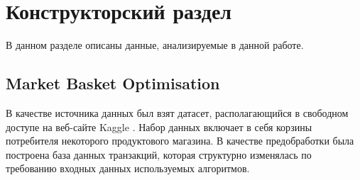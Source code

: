 \section{Конструкторский раздел}

В данном разделе описаны данные, анализируемые в данной работе.

\subsection{Market Basket Optimisation}

В качестве источника данных был взят датасет, располагающийся в свободном доступе на веб-сайте Kaggle \cite{dataset}. Набор данных включает в себя корзины потребителя некоторого продуктового магазина. В качестве предобработки была построена база данных транзакций, которая структурно изменялась по требованию входных данных используемых алгоритмов.

\pagebreak